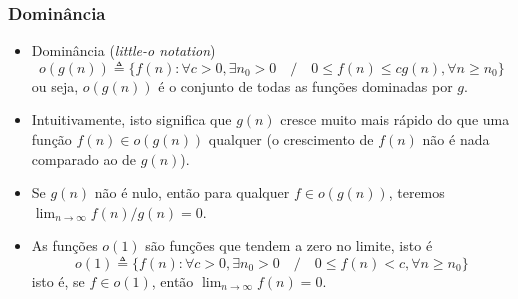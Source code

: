 \begin{frame}[allowframebreaks]
  \frametitle{Dominância}
  \begin{itemize}
  \item Dominância (\textit{little-o notation})
	\begin{equation}
	o(g(n)) \triangleq \{ f(n) : \forall c > 0, \exists n_0 > 0 \quad / \quad 0 \leq f(n) \leq c g(n), \forall n \geq n_0 \}
	\end{equation}
	ou seja, $o(g(n))$ é o conjunto de todas as funções dominadas por $g$.
  \item Intuitivamente, isto significa que $g(n)$ cresce muito mais rápido do que uma função
	$f(n) \in o(g(n))$ qualquer (o crescimento de $f(n)$ não é nada comparado ao de $g(n)$).
  \item Se $g(n)$ não é nulo, então para qualquer $f \in o(g(n))$, teremos $\lim_{n \rightarrow \infty} f(n)/g(n) = 0$.
  \item As funções $o(1)$ são funções que tendem a zero no limite, isto é
	\begin{equation}
	o(1) \triangleq \{ f(n) : \forall c > 0 , \exists n_0 > 0 \quad / \quad 0 \leq f(n) < c, \forall n \geq n_0 \}
	\end{equation}
	isto é, se $f \in o(1)$, então $\lim_{n \rightarrow \infty} f(n) = 0$.
  \end{itemize}
\end{frame}

